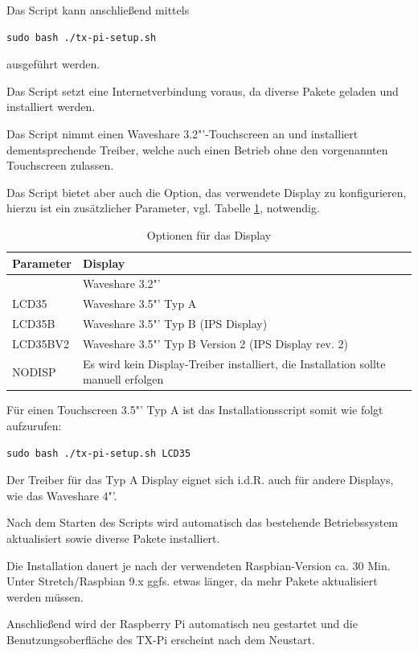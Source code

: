 \documentclass[
  paper=A4,
  ngerman,
  fontsize=12pt,
  parskip=half-,
]{scrbook}
\begin{document}
Das Script kann anschließend mittels
\begin{lstlisting}
sudo bash ./tx-pi-setup.sh
\end{lstlisting}
ausgeführt werden.

Das Script setzt eine Internetverbindung voraus, da diverse Pakete geladen und
installiert werden.

Das Script nimmt einen Waveshare 3.2"'-Touchscreen an und installiert
dementsprechende Treiber, welche auch einen Betrieb ohne den vorgenannten
Touchscreen zulassen.

Das Script bietet aber auch die Option, das verwendete Display zu 
konfigurieren, hierzu ist ein zusätzlicher Parameter, vgl. Tabelle \ref{tab:display_opt},
notwendig.

\begin{table}[ht]
\begin{tabular}{ll}
Parameter & Display \\
\midrule
          & Waveshare 3.2"' \\
LCD35     & Waveshare 3.5"' Typ A \\
LCD35B    & Waveshare 3.5"' Typ B (IPS Display)\\
LCD35BV2  & Waveshare 3.5"' Typ B Version 2 (IPS Display rev. 2)\\
NODISP    & Es wird kein Display-Treiber installiert, die Installation sollte manuell erfolgen\\
\end{tabular}
\caption{Optionen für das Display}
\label{tab:display_opt}
\end{table}

Für einen Touchscreen 3.5"' Typ A ist das Installationsscript somit wie folgt aufzurufen:
\begin{lstlisting}
sudo bash ./tx-pi-setup.sh LCD35
\end{lstlisting}

Der Treiber für das Typ A Display eignet sich i.d.R. auch für andere
Displays, wie das Waveshare 4"'.


Nach dem Starten des Scripts wird automatisch das bestehende Betriebssystem aktualisiert
sowie diverse Pakete installiert. 

Die Installation dauert je nach der verwendeten Raspbian-Version ca. 30 Min. Unter Stretch/Raspbian 9.x
ggfs. etwas länger, da mehr Pakete aktualisiert werden müssen.

Anschließend wird der Raspberry Pi automatisch neu gestartet und die Benutzungsoberfläche des TX-Pi erscheint nach dem Neustart.
\end{document}
